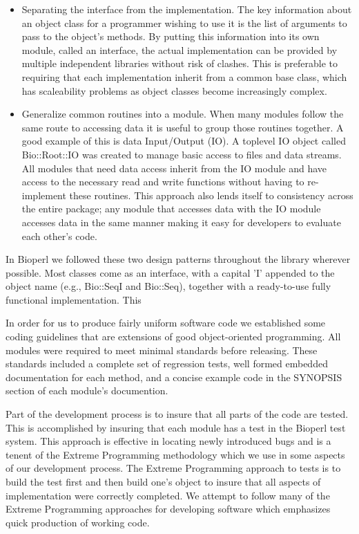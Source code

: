 \documentclass[12pt]{article}
\begin{document}
\begin{itemize}

\item Separating the interface from the implementation.  The key
information about an object class for a programmer wishing to use it
is the list of arguments to pass to the object's methods.  By
putting this information into its own module, called an interface, the actual
implementation can be provided by multiple independent libraries
without risk of clashes.  This is preferable to requiring that each
implementation inherit from a common base class, which has
scaleability problems as object classes become increasingly complex.

\item Generalize common routines into a module.  When many modules
follow the same route to accessing data it is useful to group those
routines together.  A good example of this is data Input/Output (IO).
A toplevel IO object called Bio::Root::IO was created to manage basic
access to files and data streams.  All modules that need data access
inherit from the IO module and have access to the necessary read and
write functions without having to re-implement these routines.  This
approach also lends itself to consistency across the entire package; any
module that accesses data with the IO module accesses data in the
same manner making it easy for developers to evaluate each other's
code. 

\end{itemize}

In Bioperl we followed these two design patterns \cite{gangoffour}
throughout the library wherever possible.  Most classes come as an
interface, with a capital 'I' appended to the object name (e.g.,
Bio::SeqI and Bio::Seq), together with a ready-to-use fully functional
implementation.  This 

In order for us to produce fairly uniform software code we established
some coding guidelines that are extensions of good object-oriented
programming.  All modules were required to meet minimal standards
before releasing.  These standards included a complete set of
regression tests, well formed embedded documentation for each method,
and a concise example code in the SYNOPSIS section of each module's
documention.

Part of the development process is to insure that all parts of the
code are tested.  This is accomplished by insuring that each module
has a test in the Bioperl test system.  This approach is effective in
locating newly introduced bugs and is a tenent of the Extreme
Programming\cite{xprogramming} methodology which we use in some
aspects of our development process.  The Extreme Programming approach
to tests is to build the test first and then build one's object to
insure that all aspects of implementation were correctly completed.
We attempt to follow many of the Extreme Programming approaches for
developing software which emphasizes quick production of working code. 
\end{document}
